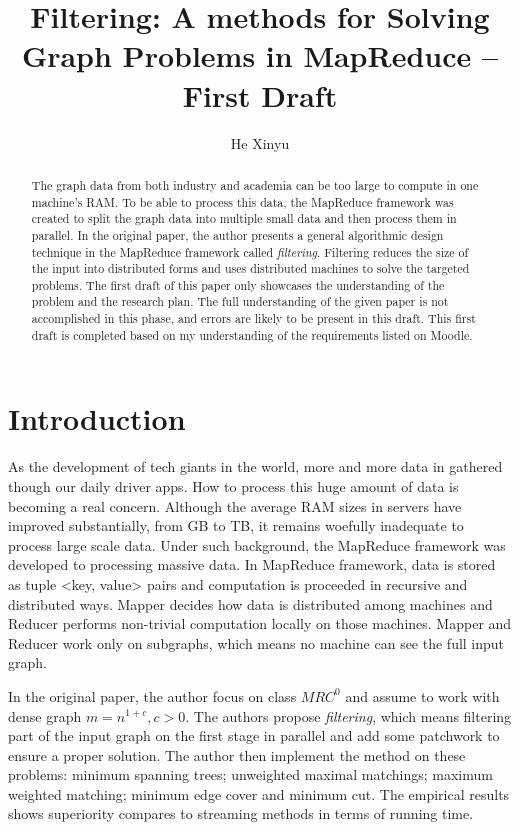 \documentclass[a4paper,11pt]{article}
\title{Filtering: A methods for Solving Graph Problems in MapReduce -- First Draft}
\author{He Xinyu}
\begin{document}
\maketitle


\begin{abstract}
  The graph data from both industry and academia can be too large to compute in one machine's RAM. To be able to process this data, the MapReduce framework was created to split the graph data into multiple small data and then process them in parallel. In the original paper, the author presents a general algorithmic design technique in the MapReduce framework called \textit{filtering}. Filtering reduces the size of the input into distributed forms and uses distributed machines to solve the targeted problems. The first draft of this paper only showcases the understanding of the problem and the research plan. The full understanding of the given paper is not accomplished in this phase, and errors are likely to be present in this draft. This first draft is completed based on my understanding of the requirements listed on Moodle.
\end{abstract}


\section{Introduction}
As the development of tech giants in the world, more and more data in gathered though our daily driver apps. How to process this huge amount of data is becoming a real concern. Although the average RAM sizes in servers have improved substantially, from GB to TB, it remains woefully inadequate to process large scale data. Under such background, the MapReduce framework was developed to processing massive data. In MapReduce framework, data is stored as tuple <key, value> pairs and computation is proceeded in recursive and distributed ways. Mapper decides how data is distributed among machines and Reducer performs non-trivial computation locally on those machines. Mapper and Reducer work only on subgraphs, which means no machine can see the full input graph.

In the original paper, the author focus on class $MRC^0$ and assume to work with dense graph $m=n^{1+c}, c>0$\cite{Filtering2011}. The authors propose \textit{filtering}, which means filtering part of the input graph on the first stage in parallel and add some patchwork to ensure a proper solution. The author then implement the method on these problems: minimum spanning trees; unweighted maximal matchings; maximum weighted matching; minimum edge cover and minimum cut. The empirical results shows superiority compares to streaming methods in terms of running time.
\end{document}
